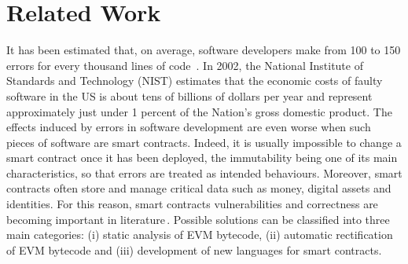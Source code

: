 \section{Related Work}\label{sec:related_work}

% 
% 
% 

It has been estimated that, on average, software developers make from 100 to 150 errors
for every thousand lines of code~\cite{software_engineering}.
In 2002, the National Institute of Standards and Technology (NIST) estimates that the economic
costs of faulty software in the US is about tens of billions of dollars per year and represent
approximately just under 1 percent of the Nation's gross domestic product.
The effects induced by errors in software development are even worse when such pieces of software
are smart contracts. Indeed, it is usually impossible to change a smart contract once
it has been deployed, the immutability being one of its main characteristics, so that
errors are treated as intended behaviours. Moreover, smart contracts often store and
manage critical data such as money, digital assets and identities. For this reason, smart contracts
vulnerabilities and correctness are becoming important in literature\,\cite{smart_contracts_verification}. Possible solutions can be
classified into three main categories: (i) static analysis of EVM bytecode,
(ii) automatic rectification of EVM bytecode and (iii) development of new languages
for smart contracts.

